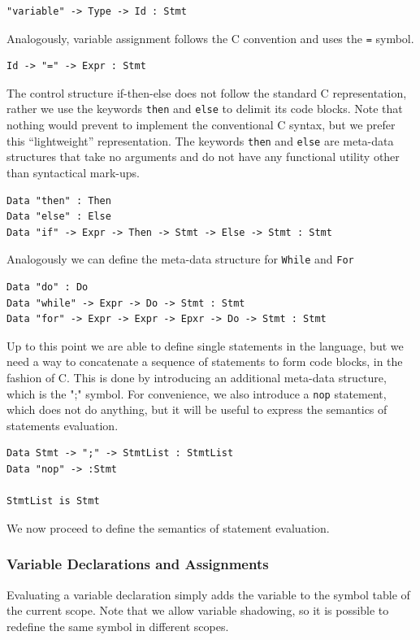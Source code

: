 \begin{lstlisting}
"variable" -> Type -> Id : Stmt
\end{lstlisting}

\noindent
Analogously, variable assignment follows the C convention and uses the \texttt{=} symbol.

\begin{lstlisting}
Id -> "=" -> Expr : Stmt
\end{lstlisting}

The control structure if-then-else does not follow the standard C representation, rather we use the keywords \texttt{then} and \texttt{else} to delimit its code blocks. Note that nothing would prevent to implement the conventional C syntax, but we prefer this ``lightweight'' representation. The keywords \texttt{then} and \texttt{else} are meta-data structures that take no arguments and do not have any functional utility other than syntactical mark-ups.

\begin{lstlisting}
Data "then" : Then
Data "else" : Else
Data "if" -> Expr -> Then -> Stmt -> Else -> Stmt : Stmt
\end{lstlisting}

Analogously we can define the meta-data structure for \texttt{While} and \texttt{For}

\begin{lstlisting}
Data "do" : Do
Data "while" -> Expr -> Do -> Stmt : Stmt
Data "for" -> Expr -> Expr -> Epxr -> Do -> Stmt : Stmt
\end{lstlisting}

\noindent
Up to this point we are able to define single statements in the language, but we need a way to concatenate a sequence of statements to form code blocks, in the fashion of C. This is done by introducing an additional meta-data structure, which is the ";" symbol. For convenience, we also introduce a \texttt{nop} statement, which does not do anything, but it will be useful to express the semantics of statements evaluation.

\begin{lstlisting}
Data Stmt -> ";" -> StmtList : StmtList
Data "nop" -> :Stmt

StmtList is Stmt

\end{lstlisting}

We now proceed to define the semantics of statement evaluation. 

\subsubsection{Variable Declarations and Assignments}
Evaluating a variable declaration simply adds the variable to the symbol table of the current scope. Note that we allow variable shadowing, so it is possible to redefine the same symbol in different scopes.

